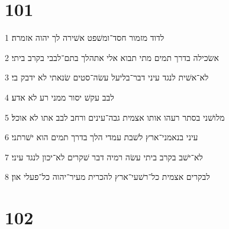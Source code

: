\chapter{101}

\par 1 לדוד מזמור חסד־ומשׁפט אשׁירה לך יהוה אזמרה׃
\par 2 אשׂכילה בדרך תמים מתי תבוא אלי אתהלך בתם־לבבי בקרב ביתי׃
\par 3 לא־אשׁית לנגד עיני דבר־בליעל עשׂה־סטים שׂנאתי לא ידבק בי׃
\par 4 לבב עקשׁ יסור ממני רע לא אדע׃
\par 5 מלושׁני בסתר רעהו אותו אצמית גבה־עינים ורחב לבב אתו לא אוכל׃
\par 6 עיני בנאמני־ארץ לשׁבת עמדי הלך בדרך תמים הוא ישׁרתני׃
\par 7 לא־ישׁב בקרב ביתי עשׂה רמיה דבר שׁקרים לא־יכון לנגד עיני׃
\par 8 לבקרים אצמית כל־רשׁעי־ארץ להכרית מעיר־יהוה כל־פעלי און׃

\chapter{102}

